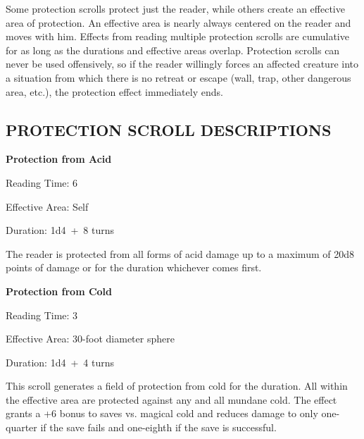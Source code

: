 \begin{multicols}{2}
Some protection scrolls protect just the reader, while others create an effective area of protection.  An effective area is nearly always centered on the reader and moves with him.  Effects from reading multiple protection scrolls are cumulative for as long as the durations and effective areas overlap.  Protection scrolls can never be used offensively, so if the reader willingly forces an affected creature into a situation from which there is no retreat or escape (wall, trap, other dangerous area, etc.), the protection effect immediately ends.

\subsection{PROTECTION SCROLL DESCRIPTIONS}

\noindent \begin{minipage}{\columnwidth}

\noindent \textbf{Protection from Acid}

\noindent Reading Time: 6

\noindent Effective Area: Self

\noindent Duration: 1d4~+~8 turns

\end{minipage}

The reader is protected from all forms of acid damage up to a maximum of 20d8 points of damage or for the duration whichever comes first.

\vspace{1em}
\noindent \begin{minipage}{\columnwidth}

\noindent \textbf{Protection from Cold}

\noindent Reading Time: 3

\noindent Effective Area: 30-foot diameter sphere

\noindent Duration: 1d4~+~4 turns

\end{minipage}

This scroll generates a field of protection from cold for the duration.  All within the effective area are protected against any and all mundane cold.  The effect grants a +6 bonus to saves vs. magical cold and reduces damage to only one-quarter if the save fails and one-eighth if the save is successful.

\vspace{1em}
\noindent \begin{minipage}{\columnwidth}


\end{minipage}
\end{multicols}
